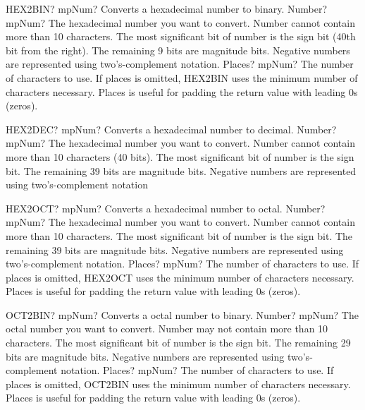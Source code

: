 \documentclass[12pt,a4paper,openany]{book}
\begin{document}
\begin{mpFunctionsExtract}
\mpWorksheetFunctionTwoNotImplemented
{HEX2BIN? mpNum? Converts a  hexadecimal number to binary.}
{Number? mpNum? The hexadecimal number you want to convert. Number cannot contain more than 10 characters. The most significant bit of number is the sign bit (40th bit from the right). The remaining 9 bits are magnitude bits. Negative numbers are represented using two's-complement notation.}
{Places? mpNum? The number of characters to use. If places is omitted, HEX2BIN uses the minimum number of characters necessary. Places is useful for padding the return value with leading 0s (zeros).}
\end{mpFunctionsExtract}

\begin{mpFunctionsExtract}
\mpWorksheetFunctionOneNotImplemented
{HEX2DEC? mpNum? Converts a hexadecimal number to decimal.}
{Number? mpNum? The hexadecimal number you want to convert. Number cannot contain more than 10 characters (40 bits). The most significant bit of number is the sign bit. The remaining 39 bits are magnitude bits. Negative numbers are represented using two's-complement notation}
\end{mpFunctionsExtract}

\begin{mpFunctionsExtract}
\mpWorksheetFunctionTwoNotImplemented
{HEX2OCT? mpNum? Converts a hexadecimal number to octal.}
{Number? mpNum? The hexadecimal number you want to convert. Number cannot contain more than 10 characters. The most significant bit of number is the sign bit. The remaining 39 bits are magnitude bits. Negative numbers are represented using two's-complement notation.}
{Places? mpNum? The number of characters to use. If places is omitted, HEX2OCT uses the minimum number of characters necessary. Places is useful for padding the return value with leading 0s (zeros).}
\end{mpFunctionsExtract}

\begin{mpFunctionsExtract}
\mpWorksheetFunctionTwoNotImplemented
{OCT2BIN? mpNum? Converts a octal number to binary.}
{Number? mpNum? The octal number you want to convert. Number may not contain more than 10 characters. The most significant bit of number is the sign bit. The remaining 29 bits are magnitude bits. Negative numbers are represented using two's-complement notation.}
{Places? mpNum? The number of characters to use. If places is omitted, OCT2BIN uses the minimum number of characters necessary. Places is useful for padding the return value with leading 0s (zeros).}
\end{mpFunctionsExtract}
\end{document}
